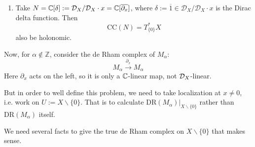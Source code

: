 \begin{example}
\begin{enumerate}
        \item Take $N = \mathbb{C}[\delta] := \mathcal{D}_X / \mathcal{D}_X \cdot x = \mathbb{C}[\overline{\partial_x}]$, where $\delta := \overline{1}\in \mathcal{D}_X / \mathcal{D}_X \cdot x$ is the Dirac delta function. Then $$\mathrm{CC}(N) = T_{\{0\}}^*X$$also be holonomic.

    \end{enumerate}

\end{example}

Now, for $\alpha \notin \mathbb{Z}$, consider the de Rham complex of $M_{\alpha}$: $$M_{\alpha} \xrightarrow{\partial_x} M_{\alpha}$$
Here $\partial_x$ acts on the left, so it is only a $\mathbb{C}$-linear map, not $\mathcal{D}_X$-linear.

But in order to well define this problem, we need to take localization at $x \neq 0$, i.e. work on $ U := X \backslash \{0\}$. That is to calculate $\mathrm{DR}(M_{\alpha})|_{X \backslash \{0\}}$ rather than $\mathrm{DR}(M_{\alpha})$ itself.

We need several facts to give the true de Rham complex on $X \backslash \{0\}$ that makes sense.

